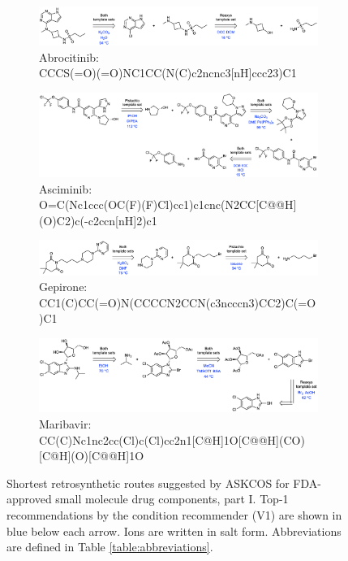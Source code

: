 \documentclass[pdflatex,sn-mathphys-num]{sn-jnl}%
\theoremstyle{thmstyleone}%
\theoremstyle{thmstyletwo}%
\theoremstyle{thmstylethree}%
\begin{document}
\begin{figure}[h!]
    \captionsetup[subfigure]{labelformat=empty}
    \begin{subfigure}[t]{1.0\textwidth}
        \includegraphics[scale=0.725]{media/SI_study/1.abrocitinib.png}
        \caption{Abrocitinib: \\ \small CCCS(=O)(=O)NC1CC(N(C)c2ncnc3[nH]ccc23)C1}
    \end{subfigure}
    \hfill
    \vspace{1cm}
    \begin{subfigure}[t]{1.0\textwidth}
        \includegraphics[scale=0.725]{media/SI_study/2.asciminib.png}
        \caption{Asciminib: \\ \small O=C(Nc1ccc(OC(F)(F)Cl)cc1)c1cnc(N2CC[C@@H](O)C2)c(-c2ccn[nH]2)c1}
    \end{subfigure}
    \hfill
    \vspace{1cm}\begin{subfigure}[t]{1.0\textwidth}
        \includegraphics[scale=0.725]{media/SI_study/3.gepirone.png}
        \caption{Gepirone: \\ \small CC1(C)CC(=O)N(CCCCN2CCN(c3ncccn3)CC2)C(=O)C1}
    \end{subfigure}
    \hfill
    \vspace{1cm}
    \begin{subfigure}[t]{1.0\textwidth}
        \includegraphics[scale=0.725]{media/SI_study/4.maribavir.png}
        \caption{Maribavir: \\ \small CC(C)Nc1nc2cc(Cl)c(Cl)cc2n1[C@H]1O[C@@H](CO)[C@H](O)[C@@H]1O}
    \end{subfigure}
    \hfill
    \caption{Shortest retrosynthetic routes suggested by ASKCOS for FDA-approved small molecule drug components, part I. Top-1 recommendations by the condition recommender (V1) are shown in blue below each arrow. Ions are written in salt form. Abbreviations are defined in Table \ref{table:abbreviations}.}
    \label{fig:fda_study_1}
\end{figure}
\end{document}

